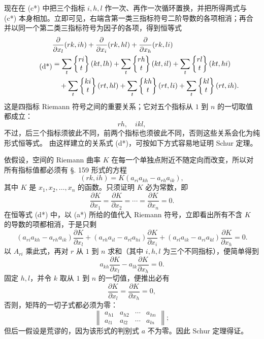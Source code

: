 现在在 (c*) 中把三个指标 \(i,h,l\) 作一次、再作一次循环置换，并把所得两式与 (c*) 本身相加。立即可见，右端含第一类三指标符号二阶导数的各项相消；再合并以同一个第二类三指标符号为因子的各项，得到恒等式
\begin{equation}\tag{d*}
\begin{aligned}
&\frac{\partial}{\partial x_l}(rk,ih)+\frac{\partial}{\partial x_i}(rk,hl)+\frac{\partial}{\partial x_h}(rk,li)\\
&=\sum_t\left\{\begin{matrix}ri\\t\end{matrix}\right\}(kt,lh)+
 \sum_t\left\{\begin{matrix}rh\\t\end{matrix}\right\}(kt,il)+
 \sum_t\left\{\begin{matrix}rl\\t\end{matrix}\right\}(kt,hi)\\
&\quad+
 \sum_t\left\{\begin{matrix}ki\\t\end{matrix}\right\}(rt,hl)+
 \sum_t\left\{\begin{matrix}kh\\t\end{matrix}\right\}(rt,li)+
 \sum_t\left\{\begin{matrix}kl\\t\end{matrix}\right\}(rt,ih).
\end{aligned}
\end{equation}
这是四指标 Riemann 符号之间的重要关系；它对五个指标从 \(1\) 到 \(n\) 的一切取值都成立：
\[
 r h,
\quad i k l,
\]
不过，后三个指标须彼此不同，前两个指标也须彼此不同，否则这些关系会化为纯形式恒等式。
由这样建立的关系式 (d*)，可按如下方式容易地证明 Schur 定理。

依假设，空间的 Riemann 曲率 \(K\) 在每一个单独点附近不随定向而改变，所以对所有指标值都必须有 \S. 159 形式的方程
\[
 (rk,ih)=K(a_{ri}a_{kh}-a_{rh}a_{ik}),
\]
其中 \(K\) 是 \(x_1,x_2,\ldots,x_n\) 的函数。只须证明 \(K\) 必为常数，即
\[
 \frac{\partial K}{\partial x_1}=\frac{\partial K}{\partial x_2}=\cdots=\frac{\partial K}{\partial x_n}=0.
\]
在恒等式 (d*) 中，以 (a*) 所给的值代入 Riemann 符号，立即看出所有不含 \(K\) 的导数的项都相消，于是只剩
\[
 (a_{ri}a_{kh}-a_{rh}a_{ik})\frac{\partial K}{\partial x_l}
 +(a_{rh}a_{il}-a_{rl}a_{hi})\frac{\partial K}{\partial x_i}
 +(a_{rl}a_{ik}-a_{ri}a_{kl})\frac{\partial K}{\partial x_h}=0.
\]
以 \(A_{ri}\) 乘此式，再对 \(r\) 从 \(1\) 到 \(n\) 求和（其中 \(i,h,l\) 为三个不同指标），便简单得到
\[
 a_{kh}\frac{\partial K}{\partial x_l}-a_{lk}\frac{\partial K}{\partial x_h}=0.
\]
固定 \(h,l\)，并令 \(k\) 取从 \(1\) 到 \(n\) 的一切值，便推出必有
\[
 \frac{\partial K}{\partial x_l}=\frac{\partial K}{\partial x_h}=0,
\]
否则，矩阵的一切子式都必须为零：
\[
 \left\|\begin{matrix}
 a_{h1}&a_{h2}&\cdots&a_{hn}\\
 a_{l1}&a_{l2}&\cdots&a_{ln}
 \end{matrix}\right\|;
\]
但后一假设是荒谬的，因为该形式的判别式 \(a\) 不为零。因此 Schur 定理得证。

